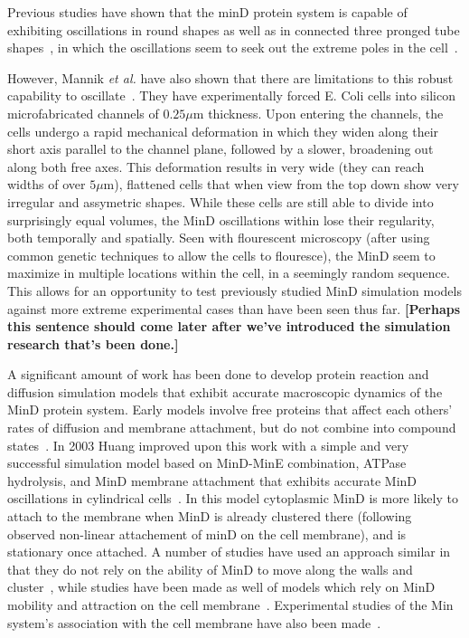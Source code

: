 \documentclass[letterpaper,twocolumn,amsmath,amssymb,pre]{revtex4-1}
\newcommand{\red}[1]{{\bf \color{red} #1}}
\newcommand{\fixme}[1]{\red{[#1]}}
\newcommand\micron{\ensuremath{\mu\text{m}}}
\begin{document}
Previous studies have shown that the minD protein system is capable of
exhibiting oscillations in round shapes \cite{fange2006noise}as well
as in connected three pronged tube shapes~\cite{varma2008min}, in
which the oscillations seem to seek out the extreme poles in the
cell~\cite{corbin2002exploring,juarez2010changes}.

However, Mannik \emph{et al.} have also shown that there are
limitations to this robust capability to
oscillate~\cite{mannik2010bacteria,mannik2009bacterial}. They have
experimentally forced E. Coli cells into silicon microfabricated
channels of $0.25\micron$ thickness. Upon entering the channels, the
cells undergo a rapid mechanical deformation in which they widen along
their short axis parallel to the channel plane, followed by a slower,
broadening out along both free axes.  This deformation results in very
wide (they can reach widths of over $5\micron$), flattened cells that
when view from the top down show very irregular and assymetric shapes.
While these cells are still able to divide into surprisingly equal
volumes, the MinD oscillations within lose their regularity, both
temporally and spatially. Seen with flourescent microscopy (after
using common genetic techniques to allow the cells to flouresce), the
MinD seem to maximize in multiple locations within the cell, in a
seemingly random sequence. This allows for an opportunity to test
previously studied MinD simulation models against more extreme
experimental cases than have been seen thus far. \fixme{Perhaps this
  sentence should come later after we've introduced the simulation
  research that's been done.}

A significant amount of work has been done to develop protein reaction
and diffusion simulation models that exhibit accurate macroscopic
dynamics of the MinD protein system. Early models involve free
proteins that affect each others' rates of diffusion and membrane
attachment, but do not combine into compound
states~\cite{meinhardt2001pattern}.  In 2003 Huang improved upon this
work with a simple and very successful simulation model based on
MinD-MinE combination, ATPase hydrolysis, and MinD membrane attachment
that exhibits accurate MinD oscillations in cylindrical
cells~\cite{huang2003dynamic}. In this model cytoplasmic MinD is more
likely to attach to the membrane when MinD is already clustered there
(following observed non-linear attachement of minD on the cell
membrane), and is stationary once attached.  A number of studies have
used an approach similar in that they do not rely on the ability of
MinD to move along the walls and
cluster~\cite{kruse2007experimentalist, meinhardt2001pattern,
  drew2005polymerization, fange2006noise, kerr2006division}, while
studies have been made as well of models which rely on MinD mobility
and attraction on the cell membrane~\cite{kruse2002dynamic,
  howard2005cellular}.  Experimental studies of the Min system's
association with the cell membrane have also been
made~\cite{hsieh2010direct,mileykovskaya2003effects}.
\end{document}
